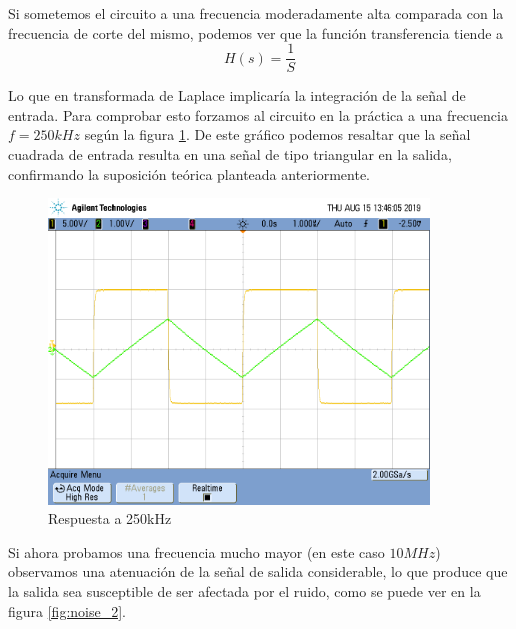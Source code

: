 Si sometemos el circuito a una frecuencia moderadamente alta comparada con la frecuencia de corte del mismo, podemos ver que la funci\'on transferencia tiende a 
\begin{equation}\label{integrador_2}
    H(s)=\frac{1}{S}
\end{equation}

Lo que en transformada de Laplace implicar\'ia la integraci\'on de la se\~nal de entrada. Para comprobar esto forzamos al circuito en la pr\'actica a una frecuencia $f=250kHz$ seg\'un la figura \ref{fig:altafrec_2}. De este gr\'afico podemos resaltar que la se\~nal cuadrada de entrada resulta en una se\~nal de tipo triangular en la salida, confirmando la suposici\'on te\'orica planteada anteriormente.

\begin{figure}[h!]
    \centering
    \includegraphics[width=0.9\textwidth]{EJ2_integrador.png}
    \caption{Respuesta a 250kHz}
    \label{fig:altafrec_2} 
\end{figure}

 Si ahora probamos una frecuencia mucho mayor (en este caso $10MHz$) observamos una atenuaci\'on de la se\~nal de salida considerable, lo que produce que la salida sea susceptible de ser afectada por el ruido, como se puede ver en la figura \ref{fig:noise_2}.
 
